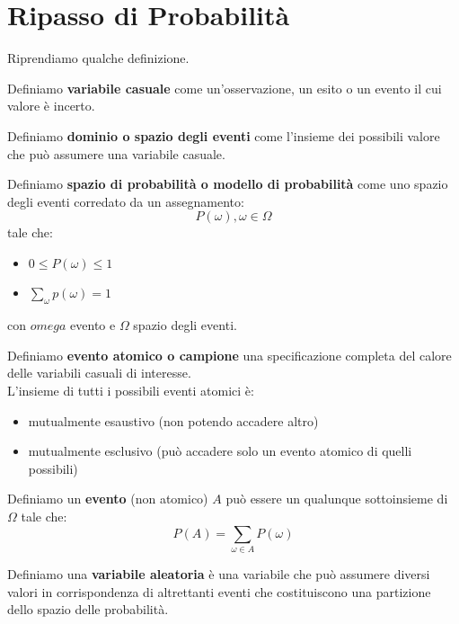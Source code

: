 \documentclass[a4paper,12pt, oneside]{book}
\begin{document}
\chapter{Ripasso di Probabilità}
Riprendiamo qualche definizione.
\begin{definizione}
  Definiamo \textbf{variabile casuale} come un'osservazione, un esito o un
  evento il cui valore è incerto.
\end{definizione}
\begin{definizione}
  Definiamo \textbf{dominio o spazio degli eventi} come l'insieme dei possibili
  valore che può assumere una variabile casuale.
\end{definizione}
\begin{definizione}
  Definiamo \textbf{spazio di probabilità o modello di probabilità} come uno
  spazio degli eventi corredato da un assegnamento:
  \[P(\omega),\omega\in \Omega\]
  tale che:
  \begin{itemize}
    \item $0\leq P(\omega)\leq 1$
    \item $\sum_\omega p(\omega)=1$
  \end{itemize}
  con $omega$ evento e $\Omega$ spazio degli eventi.
\end{definizione}
\begin{definizione}
  Definiamo \textbf{evento atomico o campione} una specificazione completa del
  calore delle variabili casuali di interesse.\\
  L'insieme di tutti i possibili eventi atomici è:
  \begin{itemize}
    \item mutualmente esaustivo (non potendo accadere altro)
    \item mutualmente esclusivo (può accadere solo un evento atomico di quelli
    possibili) 
  \end{itemize}
\end{definizione}
\begin{definizione}
  Definiamo un \textbf{evento} (non atomico) $A$ può essere un qualunque
  sottoinsieme di $\Omega$ tale che: 
  \[P(A)=\sum_{\omega\in A}P(\omega)\]
\end{definizione}
\begin{definizione}
  Definiamo una \textbf{variabile aleatoria} è una variabile che può assumere
  diversi valori in corrispondenza di altrettanti eventi che costituiscono una
  partizione dello spazio delle probabilità.
\end{definizione}
\end{document}
